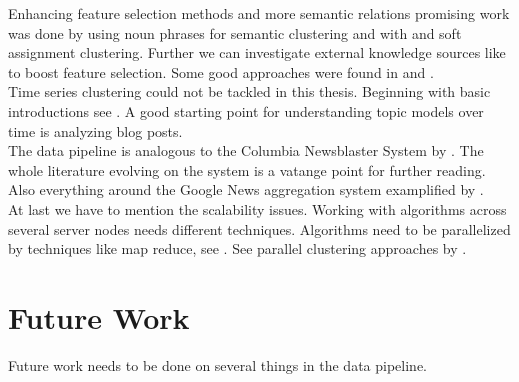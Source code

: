 Enhancing feature selection methods and more semantic relations promising work was done by \cite{NounPhraseSemanticClustering@2009@Zheng} using noun phrases for semantic clustering and 
\cite{WordNetAndFuzzyAssociation@2010@Chen} with \wordnet{} and soft assignment clustering. Further we can investigate external knowledge sources like \wiki{} to boost feature selection. Some good approaches were found in \cite{WikipediaClusteringSim2009} and \cite{WikipediaClustering2010}.\\

Time series clustering could not be tackled in this thesis. Beginning with basic introductions see \cite{ClusteringTimesSeriesSurves2005, RecentTechniquesClusteringSurvey2012, IncrementalClustering2012}. A good starting point for understanding topic models over time is \cite{BlogTopicLDA2013} analyzing blog posts.\\

The data pipeline is analogous to the Columbia Newsblaster System by \cite{NewsBlaster2002}. The whole literature evolving on the system is a vatange point for further reading. Also everything around the Google News aggregation system examplified by \cite{GoogleNews2007}.\\

At last we have to mention the scalability issues. Working with algorithms across several server nodes needs different techniques. Algorithms need to be parallelized by techniques like map reduce, see \cite{MapReduce2008}. See parallel clustering approaches by \cite{ParallelClustering2009}.

\section{Future Work}

Future work needs to be done on several things in the data pipeline.

